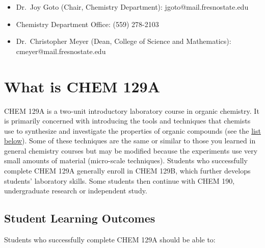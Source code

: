 \begin{itemize}
\tightlist
\item
  Dr.~Joy Goto (Chair, Chemistry Department): jgoto@mail.fresnostate.edu
\item
  Chemistry Department Office: (559) 278-2103
\item
  Dr.~Christopher Meyer (Dean, College of Science and Mathematics):
  cmeyer@mail.fresnostate.edu
\end{itemize}

\newpage

\hypertarget{what-is-chem-129a}{%
\section{What is CHEM 129A}\label{what-is-chem-129a}}

CHEM 129A is a two-unit introductory laboratory course in organic
chemistry. It is primarily concerned with introducing the tools and
techniques that chemists use to synthesize and investigate the
properties of organic compounds (see the \protect\hyperlink{slo}{list
below}). Some of these techniques are the same or similar to those you
learned in general chemistry courses but may be modified because the
experiments use very small amounts of material (micro-scale techniques).
Students who successfully complete CHEM 129A generally enroll in CHEM
129B, which further develops students' laboratory skills. Some students
then continue with CHEM 190, undergraduate research or independent
study.

\hypertarget{slo}{%
\subsection{Student Learning Outcomes}\label{slo}}

Students who successfully complete CHEM 129A should be able to:


